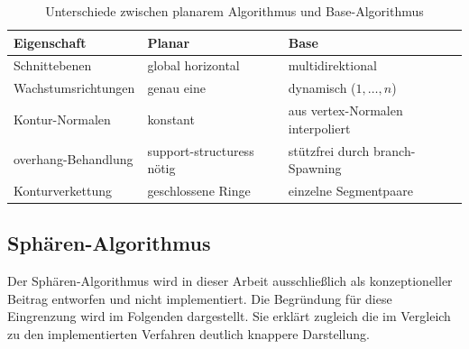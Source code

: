                 \begin{table}[ht]
                    \centering
                    \caption[Unterschiede zwischen planarem Algorithmus und Base-Algorithmus]
                    {Unterschiede zwischen planarem Algorithmus und Base-Algorithmus}
                    \label{tab:concept-base-vs-planar}
                    \begin{tabular}{@{} l l l @{}}
                        \toprule
                        \textbf{Eigenschaft} & \textbf{Planar} & \textbf{Base} \\
                        \midrule
                        Schnittebenen           & global horizontal      & multidirektional \\
                        Wachstumsrichtungen     & genau eine             & dynamisch ($1, \dots, n$) \\
                        Kontur-Normalen         & konstant               & aus \gls{vertex}-Normalen interpoliert \\
                        \Gls{overhang}-Behandlung & \glspl{support-structures} nötig & stützfrei durch \gls{branch}-Spawning \\
                        Konturverkettung        & geschlossene Ringe     & einzelne Segmentpaare \\
                        \bottomrule
                    \end{tabular}
                \end{table}

        \subsection{Sphären-Algorithmus}\label{subsec:concept-sphere-algorithm} 
            Der Sphären-Algorithmus wird in dieser Arbeit ausschließlich als konzeptioneller Beitrag entworfen und nicht implementiert.
            Die Begründung für diese Eingrenzung wird im Folgenden dargestellt.
            Sie erklärt zugleich die im Vergleich zu den implementierten Verfahren deutlich knappere Darstellung.


